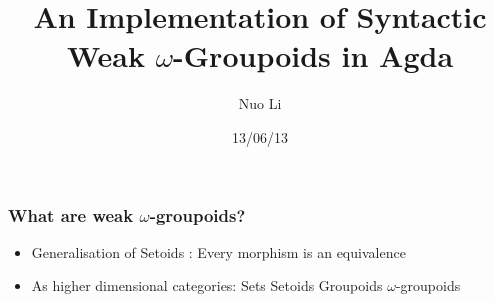 \documentclass[12pt, mathserif,handout]{beamer}
\author{
Nuo Li
}
\institute{
School of Computer Science \\  University of Nottingham, UK
}
\date[13/06/13]{13/06/13}
\title{An Implementation of Syntactic Weak $\omega$-Groupoids in Agda}
\subtitle[FP Away day 2013]{}
\newcommand{\og}{ $\omega$-groupoids}
\newcommand{\wog}{weak $\omega$-groupoids}
\begin{document}
\frame{\titlepage}




\begin{frame}
\frametitle{What are \wog ?}


\begin{itemize}
\item {Generalisation of Setoids : Every morphism is an equivalence}
\pause
\item{As higher dimensional categories: Sets Setoids Groupoids \og{}}

\end{itemize}

\pause

\begin{columns}[c] %

\begin{column}{2cm} 



\end{column}

\pause

\begin{column}{3cm}
\end{column}



\pause

\begin{column}{5cm}
\end{column}



\end{columns}

\end{frame}



\end{document}
